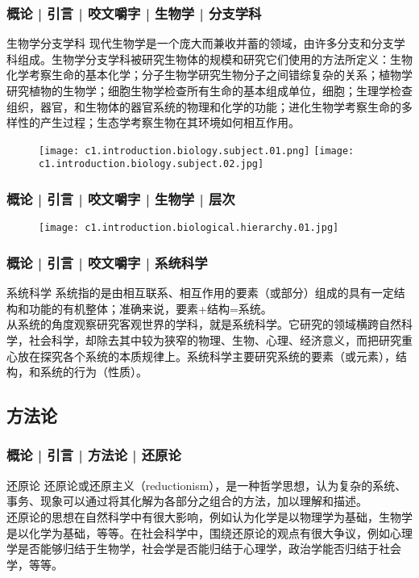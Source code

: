 \begin{frame}
  \frametitle{概论 | 引言 | 咬文嚼字 | 生物学 | 分支学科}
  \begin{block}{生物学分支学科}
现代生物学是一个庞大而兼收并蓄的领域，由许多分支和分支学科组成。生物学分支学科被研究生物体的规模和研究它们使用的方法所定义：生物化学考察生命的基本化学；分子生物学研究生物分子之间错综复杂的关系；植物学研究植物的生物学；细胞生物学检查所有生命的基本组成单位，细胞；生理学检查组织，器官，和生物体的器官系统的物理和化学的功能；进化生物学考察生命的多样性的产生过程；生态学考察生物在其环境如何相互作用。
  \end{block}
  \begin{figure}
    \centering
    \texttt{[image: c1.introduction.biology.subject.01.png]}\qquad
    \texttt{[image: c1.introduction.biology.subject.02.jpg]}
  \end{figure}
\end{frame}

\begin{frame}
  \frametitle{概论 | 引言 | 咬文嚼字 | 生物学 | 层次}
  \begin{figure}
    \centering
    \texttt{[image: c1.introduction.biological.hierarchy.01.jpg]}
  \end{figure}
\end{frame}

\begin{frame}
  \frametitle{概论 | 引言 | 咬文嚼字 | 系统科学}
  \begin{block}{系统科学}
系统指的是由相互联系、相互作用的要素（或部分）组成的具有一定结构和功能的有机整体；准确来说，要素+结构=系统。\\
\vspace{1em}
从系统的角度观察研究客观世界的学科，就是系统科学。它研究的领域横跨自然科学，社会科学，却除去其中较为狭窄的物理、生物、心理、经济意义，而把研究重心放在探究各个系统的本质规律上。系统科学主要研究系统的要素（或元素），结构，和系统的行为（性质）。 
  \end{block}
\end{frame}

\subsection{方法论}
\begin{frame}[label=current]
  \frametitle{概论 | 引言 | 方法论 | 还原论}
  \begin{block}{还原论}
还原论或还原主义（reductionism），是一种哲学思想，认为复杂的系统、事务、现象可以通过将其化解为各部分之组合的方法，加以理解和描述。\\
\vspace{1em}
还原论的思想在自然科学中有很大影响，例如认为化学是以物理学为基础，生物学是以化学为基础，等等。在社会科学中，围绕还原论的观点有很大争议，例如心理学是否能够归结于生物学，社会学是否能归结于心理学，政治学能否归结于社会学，等等。
  \end{block}
\end{frame}

